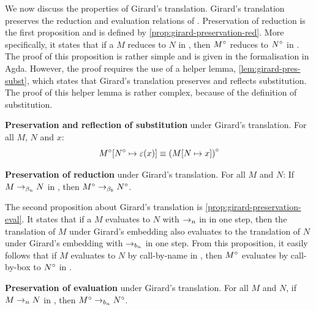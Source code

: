 We now discuss the properties of Girard's translation.
Girard's translation preserves the reduction and evaluation relations of \lan.
Preservation of reduction is the first proposition and is defined by \cref{prop:girard-preservation-red}.
More specifically, it states that if a \lterm $M$ reduces to $N$ in \lan, then ${M}^\circ$ reduces to ${N}^\circ$ in \lab.
The proof of this proposition is rather simple and is given in the formalisation in Agda.
However, the proof requires the use of a helper lemma, \cref{lem:girard-pres-subst}, which states that Girard's translation preserves and reflects substitution.
The proof of this helper lemma is rather complex, because of the definition of substitution.

\begin{lemma}
  \label{lem:girard-pres-subst}
  \textbf{Preservation and reflection of substitution} under Girard's translation. For all \lterms $M$, $N$ and $x$:
  \[
 {M}^\circ[{{N}^\circ}\mapsto{\varepsilon(x)}] \equiv {(M  [{N}\mapsto{x}] )}^\circ
  \]
\end{lemma}

\begin{proposition}
  \label{prop:girard-preservation-red}
  \textbf{Preservation of reduction} under Girard's translation.
 For all \lterm $M$ and $N$:
  \center 
 If $M \to_{\beta_n} N$ in \lan, then ${M}^\circ \to_{\beta_b} {N}^\circ$.
\end{proposition}

The second proposition about Girard's translation is \cref{prop:girard-preservation-eval}.
It states that if a \lterm $M$ evaluates to \lterm $N$ with $\to_n$ in \lan in one step,
then the translation of $M$ under Girard's embedding also evaluates to the translation of $N$ under Girard's embedding with $\to_{b_n}$ in one step.
From this proposition, it easily follows that if $M$ evaluates to $N$ by call-by-name in \lan, then ${M}^\circ$ evaluates by call-by-box to ${N}^\circ$ in \lab.

\begin{proposition}
  \label{prop:girard-preservation-eval}
  \textbf{Preservation of evaluation} under Girard's translation.
  \center
 For all \lterm $M$ and $N$, if $M \to_n N$ in \lan, then ${M}^\circ \to_{b_n} {N}^\circ$.
\end{proposition}